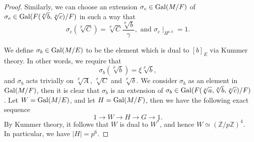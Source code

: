 \documentclass[12pt,leqno]{amsart}
\theoremstyle{plain}
\theoremstyle{definition}
\newcommand{\Z}{{\mathbb Z}}
\begin{document}
\begin{proof}
Similarly, we can choose an extension  $\sigma_c\in {\rm Gal}(M/F)$ of $\sigma_c\in {\rm Gal}(F(\sqrt[p]{b},\sqrt[p]{c})/F)$ in such a way that
\[
\sigma_c(\sqrt[p]{C})= \sqrt[p]{C} \frac{\sqrt[p]{b}}{\gamma}, \text{ and } \sigma_c\mid_{H^{a,b}}=1.
\]

We define $\sigma_b\in {\rm Gal}(M/E)$ to be the element which is dual to $[b]_E$ via Kummer theory. In other words, we require that
\[
\sigma_b(\sqrt[p]{b})=\xi \sqrt[p]{b},
\]
and $\sigma_b$ acts trivially on $\sqrt[p]{A}$, $\sqrt[p]{C}$ and $\sqrt[p]{\delta}$. We consider $\sigma_b$ as an element in ${\rm Gal}(M/F)$, then it is clear that $\sigma_b$ is an extension of $\sigma_b\in {\rm Gal}(F(\sqrt[p]{a},\sqrt[p]{b},\sqrt[p]{c})/F)$.
Let $W={\rm Gal}(M/E)$, and let $H={\rm Gal}(M/F)$, then we have the following exact sequence
\[
1\to W\to H\to G\to 1.
\]
By Kummer theory, it follows that $W$ is dual to $W^*$, and hence $W\simeq (\Z/p\Z)^4$. In particular, we have $|H|=p^6$.



\end{proof}
\end{document}
